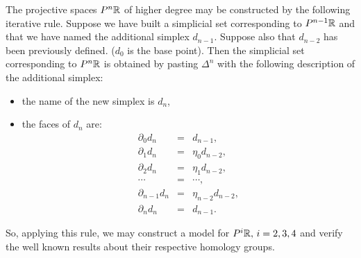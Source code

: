 The projective spaces $P^n{{\mathbb{R}}}$ of higher degree may be constructed by the following iterative
rule. Suppose we have built a simplicial set corresponding to $P^{n-1}{{\mathbb{R}}}$ and that we have
named the  additional simplex $d_{n-1}$. Suppose also that $d_{n-2}$ has been previously defined.
($d_0$ is the base point).
Then the simplicial set corresponding to $P^n{{\mathbb{R}}}$ is obtained by pasting $\Delta^n$ with the following
description of the additional simplex:
\begin{itemize}
\item the name of the new simplex is  $d_n$,
\item the  faces of $d_n$ are:
\begin{eqnarray*}
\partial_0 d_n & = & d_{n-1},\\
\partial_1 d_n & = & \eta_0 d_{n-2},\\
\partial_2 d_n & = & \eta_1 d_{n-2},\\
\cdots         & = & \cdots , \\
\partial_{n-1} d_n & = & \eta_{n-2} d_{n-2},\\
\partial_n d_n & = & d_{n-1}.
\end{eqnarray*}
\end{itemize}
So, applying this rule, we may construct a  model for  $P^i{{\mathbb{R}}},\, i=2,3,4$ and verify  the well known results
about their respective homology groups.
